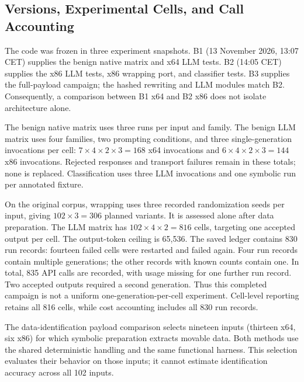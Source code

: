 \subsection{Versions, Experimental Cells, and Call Accounting}
The code was frozen in three experiment snapshots. B1 (13 November 2026,
13:07 CET) supplies the benign native matrix and x64 LLM tests. B2
(14:05 CET) supplies the x86 LLM tests, x86 wrapping port, and classifier
tests. B3 supplies the full-payload campaign; the hashed rewriting and LLM
modules match B2. Consequently, a comparison between B1 x64 and B2 x86
does not isolate architecture alone.

The benign native matrix uses three runs per input and family. The benign
LLM matrix uses four families, two prompting conditions, and three
single-generation invocations per cell: $7\times4\times2\times3=168$
x64 invocations and $6\times4\times2\times3=144$ x86 invocations.
Rejected responses and transport failures remain in these totals; none is
replaced. Classification uses three LLM invocations and one symbolic run
per annotated fixture.

On the original corpus, wrapping uses three recorded randomization seeds
per input, giving $102\times3=306$ planned variants. It is assessed alone
after data preparation. The LLM matrix has $102\times4\times2=816$ cells,
targeting one accepted output per cell. The output-token ceiling is 65,536.
The saved ledger contains 830 run records: fourteen failed cells were
restarted and failed again. Four run records contain multiple generations;
the other records with known counts contain one. In total, 835 API calls
are recorded, with usage missing for one further run record. Two accepted
outputs required a second generation. Thus this completed campaign is not
a uniform one-generation-per-cell experiment. Cell-level reporting retains
all 816 cells, while cost accounting includes all 830 run records.

The data-identification payload comparison selects nineteen inputs
(thirteen x64, six x86) for which symbolic preparation extracts movable
data. Both methods use the shared deterministic handling and the same
functional harness. This selection evaluates their behavior on those
inputs; it cannot estimate identification accuracy across all 102 inputs.

